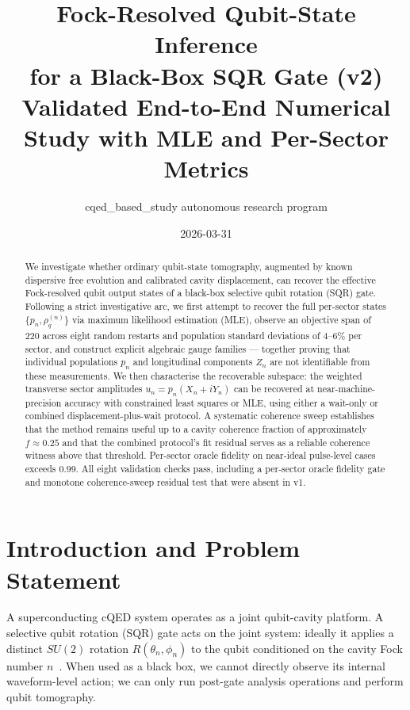 \documentclass[11pt,onecolumn]{article}
\title{Fock-Resolved Qubit-State Inference\\for a Black-Box SQR Gate (v2)\\
\large Validated End-to-End Numerical Study with MLE and Per-Sector Metrics}
\author{cqed\_based\_study autonomous research program}
\date{2026-03-31}
\begin{document}
\maketitle

\begin{abstract}
We investigate whether ordinary qubit-state tomography, augmented by known
dispersive free evolution and calibrated cavity displacement, can recover
the effective Fock-resolved qubit output states of a black-box selective qubit
rotation (SQR) gate.  Following a strict investigative arc, we first attempt to
recover the full per-sector states $\{p_n, \rho_q^{(n)}\}$ via maximum likelihood
estimation (MLE), observe an objective span of 220 across eight random restarts and
population standard deviations of 4--6\% per sector, and construct explicit algebraic
gauge families — together proving that individual populations $p_n$ and longitudinal
components $Z_n$ are not identifiable from these measurements.  We then characterise
the recoverable subspace: the weighted transverse sector amplitudes
$u_n = p_n(X_n + iY_n)$ can be recovered at near-machine-precision accuracy with
constrained least squares or MLE, using either a wait-only or combined
displacement-plus-wait protocol.  A systematic coherence sweep establishes that the
method remains useful up to a cavity coherence fraction of approximately $f\approx0.25$
and that the combined protocol's fit residual serves as a reliable coherence witness
above that threshold.  Per-sector oracle fidelity on near-ideal pulse-level cases
exceeds 0.99.  All eight validation checks pass, including a per-sector oracle
fidelity gate and monotone coherence-sweep residual test that were absent in v1.
\end{abstract}

\tableofcontents
\newpage

\section{Introduction and Problem Statement}

A superconducting cQED system operates as a joint qubit-cavity platform.  A
selective qubit rotation (SQR) gate acts on the joint system: ideally it applies a
distinct $SU(2)$ rotation $R(\theta_n,\phi_n)$ to the qubit conditioned on the
cavity Fock number $n$~\cite{heeres2015}.  When used as a black box, we cannot
directly observe its internal waveform-level action; we can only run post-gate
analysis operations and perform qubit tomography.
\end{document}

